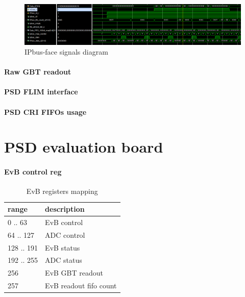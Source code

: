 \documentclass{article}
\begin{document}
\begin{figure}[H]
	\centering 
	\includegraphics[width=1.0\textwidth]{ipbus-face-waves.png}
	\caption{\label{fig:11} IPbus-face signals diagram }
\end{figure}



\subsection{Raw GBT readout}\label{sec:gbt-rd}



\subsection{PSD FLIM interface}\label{sec:flim-iface}



\subsection{PSD CRI FIFOs usage}



\newpage
\part{PSD evaluation board}

\subsection{EvB control reg}
\begin{table}[H]
\centering
\begin{tabular}{| l | l |}
\hline
range & description \\ \hline
0 .. 63 & EvB control \\ \hline
64 .. 127 & ADC control \\ \hline
128 .. 191 & EvB status \\ \hline
192 .. 255 & ADC status \\ \hline
256 & EvB GBT readout \\ \hline
257 & EvB readout fifo count \\ \hline
\end{tabular}
\caption{EvB registers mapping\label{tab6}}
\end{table}
\end{document}
